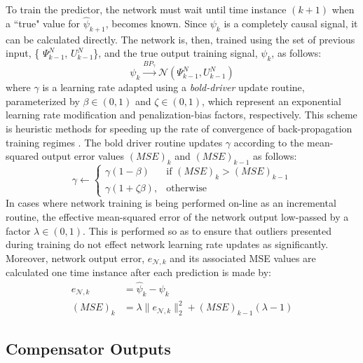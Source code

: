 To train the predictor, the network must wait until time instance $(k+1)$ when a ``true" value for $\hat{\psi}_{k+1}$, becomes known.
Since $\psi_{k}$ is a completely causal signal, it can be calculated directly. The network is, then, trained using the set of previous input, \{ ${\Psi}_{k-1}^{N}$,
${U}_{k-1}^{N}$\}, and the true output training signal, $\psi_{k}$, as follows:
	\begin{equation}
		\psi_{k} \overset{BP_{\gamma}}{\rightarrow} \mathscr{N}({\Psi}_{k-1}^{N},{U}_{k-1}^{N})
		\label{eq::training}
	\end{equation}
where $\gamma$ is a learning rate adapted using a \emph{bold-driver} update routine, parameterized by $\beta \in (0,1)$ and  $\zeta \in (0,1)$, which represent
an exponential learning rate modification and penalization-bias factors, respectively. 
This scheme is heuristic methods for speeding up the rate of convergence of back-propagation training regimes \cite{Battiti1992,Magoulas1999}. 
The bold driver routine updates $\gamma$ according to the mean-squared output error values $(MSE)_{k}$ and $(MSE)_{k-1}$ as follows:
	\begin{equation}
	    \gamma \leftarrow 
		\begin{cases}
	    \gamma (1- \beta) 		& \text{if } (MSE)_{k} > (MSE)_{k-1}\\
	    \gamma (1+\zeta \beta),& \text{otherwise}
		\end{cases}
	\end{equation}
In cases where network training is being performed on-line as an incremental routine, the effective mean-squared error of the network output low-passed
by a factor $\lambda \in (0,1)$. This is performed so as to ensure that outliers presented during training do not effect network learning rate updates as 
significantly. Moreover, network output error, $e_{\mathscr{N},k}$ and its associated MSE values are calculated one time instance after each prediction is 
made by:
	\begin{equation}
		\begin{split}
		e_{\mathscr{N},k} 	&= \hat{\psi}_{k} - \psi_{k} \\
		(MSE)_{k} 			&= \lambda \|e_{\mathscr{N},k}\|_{2}^{2} + (MSE)_{k-1}(\lambda-1)
		\end{split}
	\end{equation}


\subsection{Compensator Outputs}


